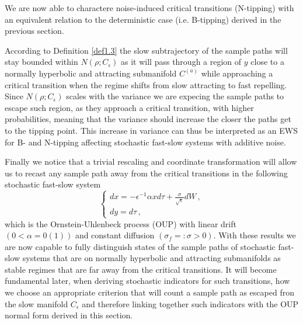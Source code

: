 \documentclass[../main.tex]{subfiles}
\begin{document}
We are now able to charactere noise-induced critical transitions (N-tipping) with an equivalent relation to the deterministic case (i.e. B-tipping) derived in the previous section.
\begin{interpretation*}{}
     According to Definition \ref{def1.3} the slow subtrajectory of the sample paths will stay bounded within $N(\rho;C_{\epsilon})$ as it will pass through a region of $y$ close to a normally hyperbolic and attracting submanifold $C^{(a)}$ while approaching a critical transition when the regime shifts from slow attracting to fast repelling. Since $N(\rho;C_{\epsilon})$ scales with the variance we are expecing the sample paths to escape such region, as they approach a critical transition, with higher probabilities, meaning that the variance should increase the closer the paths get to the tipping point. This increase in variance can thus be interpreted as an EWS for B- and N-tipping affecting stochastic fast-slow systems with additive noise.
\end{interpretation*}
Finally we notice that a trivial rescaling and coordinate transformation will allow us to recast any sample path away from the critical transitions in the following stochastic fast-slow system
\begin{equation}\label{eq1.12}
   \begin{cases}
      dx = -\epsilon^{-1}\alpha x d\tau + \frac{\sigma}{\sqrt{\epsilon}}dW \,, \\
      dy = d\tau \,, 
   \end{cases}
\end{equation}
which is the Ornstein-Uhlenbeck process (OUP) with linear drift $(0<\alpha=0(1))$ and constant diffusion $(\sigma_f=:\sigma>0)$.
With these results we are now capable to fully distinguish states of the sample paths of stochastic fast-slow systems that are on normally hyperbolic and attracting submanifolds as stable regimes that are far away from the critical transitions. It will become fundamental later, when deriving stochastic indicators for such transitions, how we choose an appropriate criterion that will count a sample path as escaped fron the slow manifold $C_{\epsilon}$ and therefore linking together such indicators with the OUP normal form derived in this section. 
\end{document}
